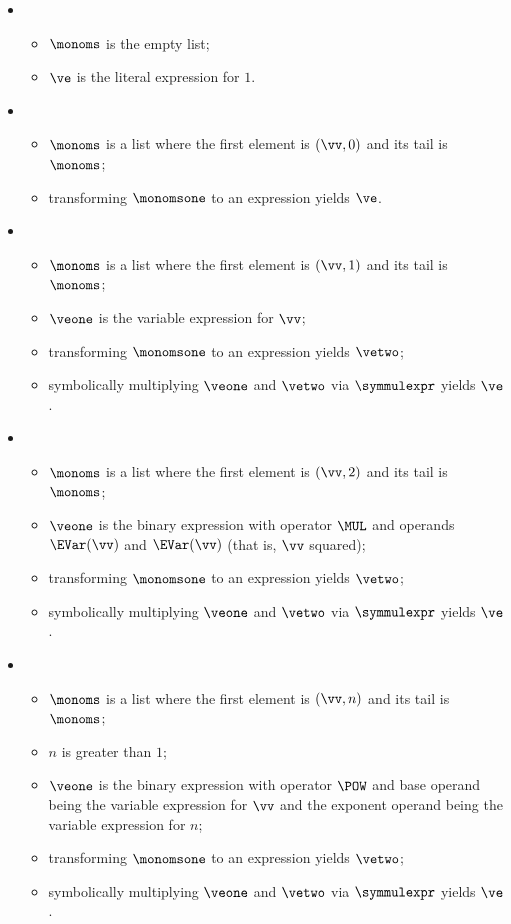 \ProseParagraph
\OneApplies
\begin{itemize}
  \item {}
  \begin{itemize}
    \item $\monoms$ is the empty list;
    \item $\ve$ is the literal expression for $1$.
  \end{itemize}

  \item {}
  \begin{itemize}
    \item $\monoms$ is a list where the first element is $(\vv, 0)$ and its tail is $\monoms$;
    \item transforming $\monomsone$ to an expression yields $\ve$.
  \end{itemize}

  \item {}
  \begin{itemize}
    \item $\monoms$ is a list where the first element is $(\vv, 1)$ and its tail is $\monoms$;
    \item $\veone$ is the variable expression for $\vv$;
    \item transforming $\monomsone$ to an expression yields $\vetwo$;
    \item symbolically multiplying $\veone$ and $\vetwo$ via $\symmulexpr$ yields $\ve$.
  \end{itemize}

  \item {}
  \begin{itemize}
    \item $\monoms$ is a list where the first element is $(\vv, 2)$ and its tail is $\monoms$;
    \item $\veone$ is the binary expression with operator $\MUL$ and operands $\EVar(\vv)$ and $\EVar(\vv)$
          (that is, $\vv$ squared);
    \item transforming $\monomsone$ to an expression yields $\vetwo$;
    \item symbolically multiplying $\veone$ and $\vetwo$ via $\symmulexpr$ yields $\ve$.
  \end{itemize}

  \item {}
  \begin{itemize}
    \item $\monoms$ is a list where the first element is $(\vv, n)$ and its tail is $\monoms$;
    \item $n$ is greater than $1$;
    \item $\veone$ is the binary expression with operator $\POW$ and base operand being the variable expression for $\vv$
          and the exponent operand being the variable expression for $n$;
    \item transforming $\monomsone$ to an expression yields $\vetwo$;
    \item symbolically multiplying $\veone$ and $\vetwo$ via $\symmulexpr$ yields $\ve$.
  \end{itemize}
\end{itemize}
